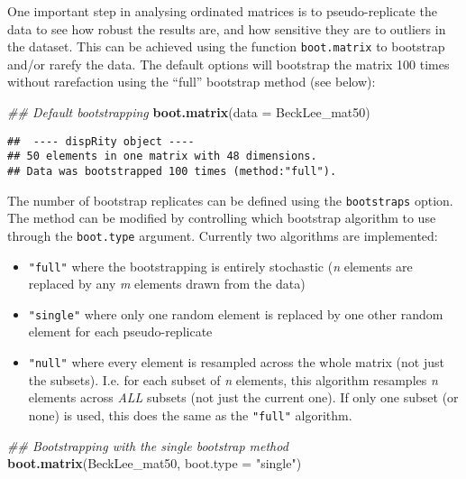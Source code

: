 \documentclass[
]{book}
\newenvironment{Shaded}{\begin{snugshade}}{\end{snugshade}}
\newcommand{\CommentTok}[1]{\textcolor[rgb]{0.56,0.35,0.01}{\textit{#1}}}
\newcommand{\DataTypeTok}[1]{\textcolor[rgb]{0.13,0.29,0.53}{#1}}
\newcommand{\KeywordTok}[1]{\textcolor[rgb]{0.13,0.29,0.53}{\textbf{#1}}}
\newcommand{\NormalTok}[1]{#1}
\newcommand{\StringTok}[1]{\textcolor[rgb]{0.31,0.60,0.02}{#1}}
\providecommand{\tightlist}{%
  \setlength{\itemsep}{0pt}\setlength{\parskip}{0pt}}
\begin{document}
One important step in analysing ordinated matrices is to pseudo-replicate the data to see how robust the results are, and how sensitive they are to outliers in the dataset.
This can be achieved using the function \texttt{boot.matrix} to bootstrap and/or rarefy the data.
The default options will bootstrap the matrix 100 times without rarefaction using the ``full'' bootstrap method (see below):

\begin{Shaded}
\begin{Highlighting}[]
\CommentTok{\#\# Default bootstrapping}
\KeywordTok{boot.matrix}\NormalTok{(}\DataTypeTok{data =}\NormalTok{ BeckLee\_mat50)}
\end{Highlighting}
\end{Shaded}

\begin{verbatim}
##  ---- dispRity object ---- 
## 50 elements in one matrix with 48 dimensions.
## Data was bootstrapped 100 times (method:"full").
\end{verbatim}

The number of bootstrap replicates can be defined using the \texttt{bootstraps} option.
The method can be modified by controlling which bootstrap algorithm to use through the \texttt{boot.type} argument.
Currently two algorithms are implemented:

\begin{itemize}
\tightlist
\item
  \texttt{"full"} where the bootstrapping is entirely stochastic (\emph{n} elements are replaced by any \emph{m} elements drawn from the data)
\item
  \texttt{"single"} where only one random element is replaced by one other random element for each pseudo-replicate
\item
  \texttt{"null"} where every element is resampled across the whole matrix (not just the subsets). I.e. for each subset of \emph{n} elements, this algorithm resamples \emph{n} elements across \emph{ALL} subsets (not just the current one). If only one subset (or none) is used, this does the same as the \texttt{"full"} algorithm.
\end{itemize}

\begin{Shaded}
\begin{Highlighting}[]
\CommentTok{\#\# Bootstrapping with the single bootstrap method}
\KeywordTok{boot.matrix}\NormalTok{(BeckLee\_mat50, }\DataTypeTok{boot.type =} \StringTok{"single"}\NormalTok{)}
\end{Highlighting}
\end{Shaded}
\end{document}
